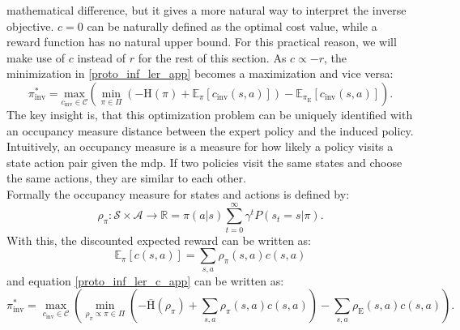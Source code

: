 mathematical difference, but it gives a more natural way to interpret the inverse objective. $c=0$ can be naturally defined as the optimal cost value, while a reward function has 
no natural upper bound. For this practical reason, we will make use of $c$ instead of $r$ for the rest of this section. As $c \propto -r$, the minimization in 
\ref{proto_inf_ler_app} becomes a maximization and vice versa:
\begin{equation}
    \label{proto_inf_ler_c_app}
    \pi_{\text{inv}}^* = \underset{c_{\text{inv}} \in \mathcal{C}}{\text{max}} \left( \min_{\pi \in \Pi} \left(- \text{H}(\pi) + \mathbb{E}_{\pi}[c_{\text{inv}}(s, a)] \right) - \mathbb{E}_{\pi_{\text{E}}}[c_{\text{inv}}(s,a)] \right).
\end{equation}
The key insight is, that this optimization problem can be uniquely identified with an occupancy measure distance between the expert policy and the 
induced policy. Intuitively, an occupancy measure is a measure for how likely a policy visits a state action pair given the \ac{mdp}. If two policies visit the same 
states and choose the same actions, they are similar to each other.\\
Formally the occupancy measure for states and actions is defined by: 
\begin{equation*}
    \rho_{\pi}:\mathcal{S} \times \mathcal{A} \rightarrow \mathbb{R} = \pi(a|s)\sum_{t=0}^\infty \gamma^tP(s_t=s|\pi).
\end{equation*}
With this, the discounted expected reward can be written as:
\begin{equation}
    \mathbb{E}_\pi[c(s,a)] = \sum_{s,a} \rho_\pi(s,a) c(s,a)
\end{equation}
and equation \ref{proto_inf_ler_c_app} can be written as:
\begin{equation}
    \label{occ_meas_obj_app}
    \pi_{\text{inv}}^* = \max_{c_{\text{inv}} \in \mathcal{C}} \left( \min_{\rho_\pi \propto \pi \in \Pi} \left(- \bar{\text{H}}(\rho_\pi) + \sum_{s,a} \rho_\pi(s,a) c(s,a) \right) - \sum_{s,a} \rho_{\text{E}}(s,a) c(s,a) \right).
\end{equation}

